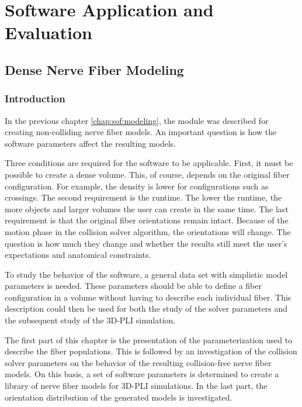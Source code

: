 \newpage\null\thispagestyle{empty}\newpage
\clearpage{\thispagestyle{empty}\cleardoublepage}
\part{Software Application and Evaluation}
\parttoc
% 
% 
% 
\setcounter{chapter}{7}
\chapter{Dense Nerve Fiber Modeling}
\label{cha:model_analysis}
% 
\section{Introduction}
%
In the previous chapter \cref{chap:sof:modeling}, the module  was described for creating non-colliding nerve fiber models.
An important question is how the software parameters affect the resulting models.
\par
%
Three conditions are required for the software to be applicable.
First, it must be possible to create a dense volume.
This, of course, depends on the original fiber configuration.
For example, the density is lower for configurations such as crossings.
The second requirement is the runtime.
The lower the runtime, the more objects and larger volumes the user can create in the same time.
The last requirement is that the original fiber orientations remain intact.
Because of the motion phase in the collision solver algorithm, the orientations will change.
The question is how much they change and whether the results still meet the user's expectations and anatomical constraints.
\par
%
To study the behavior of the software, a general data set with simplistic model parameters is needed.
These parameters should be able to define a fiber configuration in a volume without having to describe each individual fiber.
This description could then be used for both the study of the solver parameters and the subsequent study of the \ac{3D-PLI} simulation.
\par
%
The first part of this chapter is the presentation of the parameterization used to describe the fiber populations.
This is followed by an investigation of the collision solver parameters on the behavior of the resulting collision-free nerve fiber models.
On this basis, a set of software parameters is determined to create a library of nerve fiber models for \ac{3D-PLI} simulations.
In the last part, the orientation distribution of the generated models is investigated.
%
%
%
